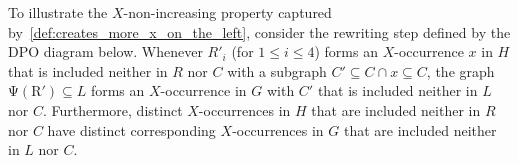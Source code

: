 \begin{example}
    To illustrate the $X$-non-increasing property captured by~\autoref{def:creates_more_x_on_the_left},
    consider the rewriting step defined by the DPO diagram below. Whenever \( R'_i \) (for \( 1 \leq i \leq 4 \)) forms an \( X \)-occurrence $x$ in $H$ that is included neither in \( R \) nor $C$ with a subgraph $C' \subseteq C \cap x \subseteq C$, the graph
    \( \operatorname{\Psi(R')} \subseteq L\) forms an \( X \)-occurrence in $G$ with $C'$ that is included neither in \( L \) nor $C$.
    Furthermore, distinct $X$-occurrences in $H$ that are included neither in \( R \) nor $C$ have distinct corresponding $X$-occurrences in $G$ that are included neither in \( L \) nor $C$.
    \begin{center} 
\end{center}
\end{example}

